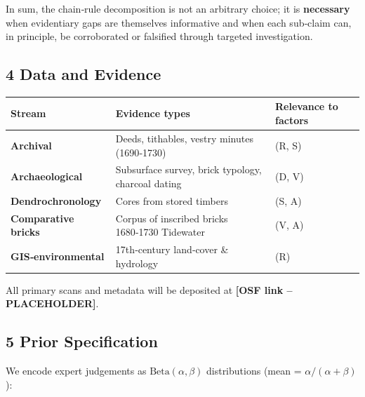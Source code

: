 \documentclass[
  11pt,
]{article}
\begin{document}
In sum, the chain‑rule decomposition is not an arbitrary choice; it is
\textbf{necessary} when evidentiary gaps are themselves informative and
when each sub‑claim can, in principle, be corroborated or falsified
through targeted investigation.

\subsection{4 Data and Evidence}\label{data-and-evidence}

\begin{longtable}[]{@{}
  >{\raggedright\arraybackslash}p{}
  >{\raggedright\arraybackslash}p{}
  >{\raggedright\arraybackslash}p{}@{}}
\toprule\noalign{}
\begin{minipage}[b]{\linewidth}\raggedright
Stream
\end{minipage} & \begin{minipage}[b]{\linewidth}\raggedright
Evidence types
\end{minipage} & \begin{minipage}[b]{\linewidth}\raggedright
Relevance to factors
\end{minipage} \\
\midrule\noalign{}
\endhead
\bottomrule\noalign{}
\endlastfoot
\textbf{Archival} & Deeds, tithables, vestry minutes (1690‑1730) & (R,
S) \\
\textbf{Archaeological} & Subsurface survey, brick typology, charcoal
dating & (D, V) \\
\textbf{Dendrochronology} & Cores from stored timbers & (S, A) \\
\textbf{Comparative bricks} & Corpus of inscribed bricks 1680‑1730
Tidewater & (V, A) \\
\textbf{GIS‑environmental} & 17th‑century land‑cover \& hydrology &
(R) \\
\end{longtable}

All primary scans and metadata will be deposited at \textbf{{[}OSF link
-- PLACEHOLDER{]}}.

\subsection{5 Prior Specification}\label{prior-specification}

We encode expert judgements as \(\mathrm{Beta}(\alpha,\beta)\)
distributions (mean = \(\alpha/(\alpha+\beta)\)):
\end{document}
